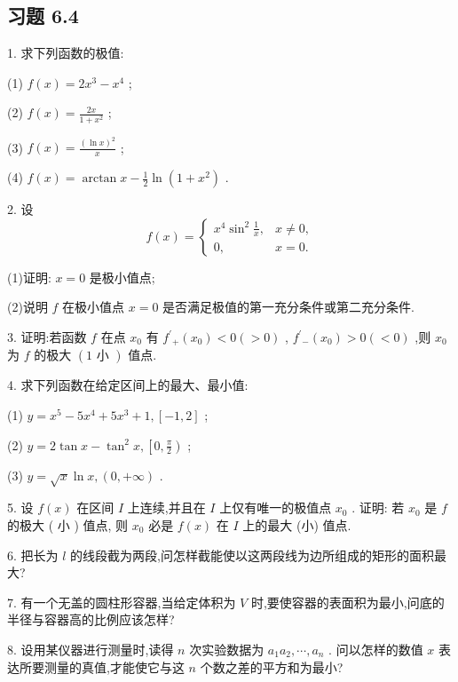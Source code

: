 \subsection{习题 6.4}

1. 求下列函数的极值:

(1) \(f\left( x\right)  = 2{x}^{3} - {x}^{4}\) ;

(2) \(f\left( x\right)  = \frac{2x}{1 + {x}^{2}}\) ;

(3) \(f\left( x\right)  = \frac{{\left( \ln x\right) }^{2}}{x}\) ;

(4) \(f\left( x\right)  = \arctan x - \frac{1}{2}\ln \left( {1 + {x}^{2}}\right)\) .

2. 设
\[
f\left( x\right)  = \left\{  \begin{array}{ll} {x}^{4}{\sin }^{2}\frac{1}{x}, & x \neq  0, \\  0, & x = 0. \end{array}\right.
\]

(1)证明: \(x = 0\) 是极小值点;

(2)说明 \(f\) 在极小值点 \(x = 0\) 是否满足极值的第一充分条件或第二充分条件.

3. 证明:若函数 \(f\) 在点 \({x}_{0}\) 有 \({f}^{\prime }{}_{ + }\left( {x}_{0}\right)  < 0\left( { > 0}\right)\) , \({f}^{\prime }{}_{ - }\left( {x}_{0}\right)  > 0\left( { < 0}\right)\) ,则 \({x}_{0}\) 为 \(f\) 的极大 \(\left( {1\text{ 小 }}\right)\) 值点.

4. 求下列函数在给定区间上的最大、最小值:

(1) \(y = {x}^{5} - 5{x}^{4} + 5{x}^{3} + 1,\left\lbrack  {-1,2}\right\rbrack\) ;

(2) \(y = 2\tan x - {\tan }^{2}x,\left\lbrack  {0,\frac{\pi }{2}}\right)\) ;

(3) \(y = \sqrt{x}\ln x,\left( {0, + \infty }\right)\) .

5. 设 \(f\left( x\right)\) 在区间 \(I\) 上连续,并且在 \(I\) 上仅有唯一的极值点 \({x}_{0}\) . 证明: 若 \({x}_{0}\) 是 \(f\) 的极大 ( 小 ) 值点, 则 \({x}_{0}\) 必是 \(f\left( x\right)\) 在 \(I\) 上的最大 (小) 值点.

6. 把长为 \(l\) 的线段截为两段,问怎样截能使以这两段线为边所组成的矩形的面积最大?

7. 有一个无盖的圆柱形容器,当给定体积为 \(V\) 时,要使容器的表面积为最小,问底的半径与容器高的比例应该怎样?

8. 设用某仪器进行测量时,读得 \(n\) 次实验数据为 \({a}_{1}{a}_{2},\cdots ,{a}_{n}\) . 问以怎样的数值 \(x\) 表达所要测量的真值,才能使它与这 \(n\) 个数之差的平方和为最小?

